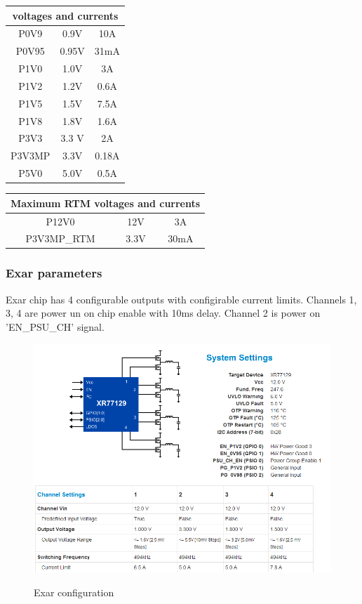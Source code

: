 \begin{longtable}{|c|c|c|} \hline
\multicolumn{3}{|c|}{voltages and currents}	\\ \hline
P0V9 & 0.9V & 10A \\ \hline
P0V95 & 0.95V & 31mA\\ \hline
P1V0 & 1.0V & 3A\\ \hline
P1V2 & 1.2V & 0.6A\\ \hline
P1V5 & 1.5V & 7.5A\\ \hline
P1V8 & 1.8V & 1.6A\\ \hline
P3V3 & 3.3 V & 2A\\ \hline
P3V3MP & 3.3V & 0.18A \\ \hline
P5V0 & 5.0V & 0.5A\\ \hline
\end{longtable}
	
\begin{longtable}{|c|c|c|} \hline
	\multicolumn{3}{|c|}{Maximum RTM voltages and currents}	\\ \hline
	P12V0 & 12V & 3A \\ \hline	
	P3V3MP\_RTM & 3.3V & 30mA \\ \hline
\end{longtable}
	
\subsubsection{Exar parameters}

Exar chip has 4 configurable outputs with configirable current limits. Channels 1, 3, 4 are power un on chip enable with 10ms delay. Channel 2 is power on 'EN\_PSU\_CH' signal. \\

	\begin{figure}[htbp!]
		\centering
		\includegraphics[scale=0.6]{img/exar1.png}\\
		\caption{Exar configuration} 
	\end{figure}
	
